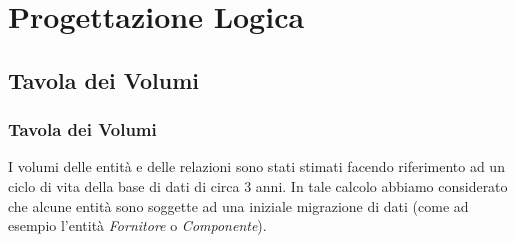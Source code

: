 \section{Progettazione Logica}
	\subsection{Tavola dei Volumi}
		\subsubsection{Tavola dei Volumi}
		\label{sec:volume_table}

			I volumi delle entità e delle relazioni sono stati stimati facendo riferimento ad un ciclo di vita della base di dati di circa 3 anni. In tale calcolo abbiamo considerato che alcune entità sono soggette ad una iniziale migrazione di dati (come ad esempio l'entità \emph{Fornitore} o \emph{Componente}).
		
